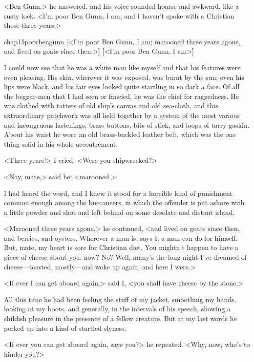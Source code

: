 <Ben Gunn,> he answered, and his voice sounded hoarse and awkward, like a rusty lock. <I'm poor Ben Gunn, I am; and I haven't spoke with a Christian these three years.>

\begin{bwbigpic}
	[\basicscale]
	{chap15poorbengunn}
	[<I'm poor Ben Gunn, I am; marooned three years agone, and lived on goats since then.>]
	[<I'm poor Ben Gunn, I am>]
\end{bwbigpic}

I could now see that he was a white man like myself and that his features were even pleasing. His skin, wherever it was exposed, was burnt by the sun; even his lips were black, and his fair eyes looked quite startling in so dark a face. Of all the beggar-men that I had seen or fancied, he was the chief for raggedness. He was clothed with tatters of old ship's canvas and old sea-cloth, and this extraordinary patchwork was all held together by a system of the most various and incongruous fastenings, brass buttons, bits of stick, and loops of tarry gaskin. About his waist he wore an old brass-buckled leather belt, which was the one thing solid in his whole accoutrement.

<Three years!> I cried. <Were you shipwrecked?>

<Nay, mate,> said he; <marooned.>

I had heard the word, and I knew it stood for a horrible kind of punishment common enough among the buccaneers, in which the offender is put ashore with a little powder and shot and left behind on some desolate and distant island.

<Marooned three years agone,> he continued, <and lived on goats since then, and berries, and oysters. Wherever a man is, says I, a man can do for himself. But, mate, my heart is sore for Christian diet. You mightn't happen to have a piece of cheese about you, now? No? Well, many's the long night I've dreamed of cheese—toasted, mostly—and woke up again, and here I were.>

<If ever I can get aboard again,> said I, <you shall have cheese by the stone.>

All this time he had been feeling the stuff of my jacket, smoothing my hands, looking at my boots, and generally, in the intervals of his speech, showing a childish pleasure in the presence of a fellow creature. But at my last words he perked up into a kind of startled slyness.

<If ever you can get aboard again, says you?> he repeated. <Why, now, who's to hinder you?>

